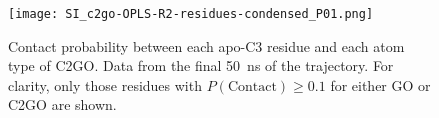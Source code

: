 \begin{figure}
    \centering
    \texttt{[image: SI\_c2go-OPLS-R2-residues-condensed\_P01.png]}
    \caption{Contact probability between each apo-C3 residue and each atom type of C2GO. Data from the final \SI{50}{\nano\second} of the trajectory. For clarity, only those residues with $P(\mathrm{Contact}) \geq 0.1$ for either GO or C2GO are shown.}
    \label{fig:prot-c2go-contacts}
\end{figure}
%
%
%


%
%
%
